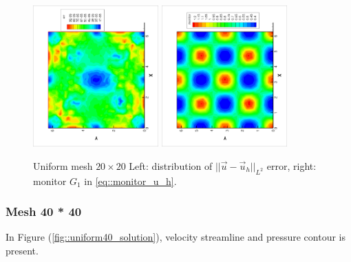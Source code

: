 \documentclass{article}
\begin{document}
 \begin{figure}[ht]
   \centering
   \includegraphics[width = 0.43\textwidth, angle = -90]{./uniform20_error.eps}
   \includegraphics[width = 0.43\textwidth, angle = -90]{./uniform20_monitor.eps}
   \caption{\small Uniform mesh $20 \times 20$ Left: distribution of
     $||\vec{u} - \vec{u}_h||_{L^2}$ error, right: monitor $G_1$ in \ref{eq::monitor_u_h}.}
   \label{fig::uniform20_error_monitor}
 \end{figure}

\subsubsection{Mesh 40 * 40}

 In Figure (\ref{fig::uniform40_solution}), velocity streamline and
 pressure contour is present.
\end{document}
